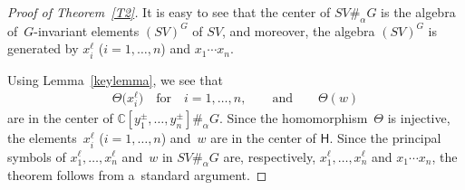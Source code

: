 \documentclass[11pt]{article}
\numberwithin{equation}{section}
\begin{document}
\begin{proof}[Proof of Theorem~\ref{T2}] It is easy to see that the center of $SV\#_\alpha G$ is the algebra of~$G$-invariant
elements $(SV)^G$ of $SV$, and moreover, the algebra $(SV)^G$ is generated by $x_i^\ell$ ($i=1,\ldots,n$) and $x_1\cdots x_n$.

Using Lemma~\ref{keylemma}, we see that
\begin{gather*}
\Theta\big(x_i^\ell\big)
\quad
\text{for}\quad i=1,\ldots, n,
\qquad
\text{and}
\qquad
\Theta(w)
\end{gather*}
are in the center of ${\mathbb{C}}[y_1^\pm, \ldots, y_n^\pm]\#_\alpha G$.
Since the homomorphism~$\Theta$ is injective, the ele\-ments~$x_i^\ell$ ($i=1,\ldots, n$) and~$w$ are in the center of
$\mathsf{H}$.
Since the principal symbols of $x_1^\ell, \ldots, x_n^\ell$ and~$w$ in $SV\#_\alpha G$ are, respectively, $x_1^\ell,
\ldots, x_n^\ell$ and $x_1\cdots x_n$, the theorem follows from a~standard argument.
\end{proof}
\end{document}
